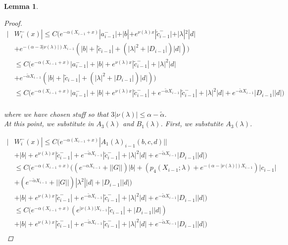 \documentclass[12pt]{article}
\newtheorem{lemma}{Lemma}
\begin{document}
\begin{lemma}
\begin{proof}
\begin{align*}
| &W_i^-(x)| \leq C \Big(e^{-\alpha(X_{i-1} + x)}|a_{i-1}^-| + |b| + e^{\nu(\lambda)x} |\tilde{c}_{i-1}^-| + |\lambda|^2 |d| \\
&+ e^{-(\alpha - 3|\nu(\lambda)|)X_{i-1}} ( |b| + |\tilde{c}_{i-1}| + (|\lambda|^2 + |D_{i-1}|)|d| ) \Big) \\
&\leq C \Big(e^{-\alpha(X_{i-1} + x)}|a_{i-1}^-| + |b| + e^{\nu(\lambda)x} |\tilde{c}_{i-1}^-| + |\lambda|^2 |d| \\
&+ e^{-\tilde{\alpha} X_{i-1}} ( |b| + |\tilde{c}_{i-1}| + (|\lambda|^2 + |D_{i-1}|)|d| ) \Big) \\
&\leq C \Big(e^{-\alpha(X_{i-1} + x)}|a_{i-1}^-| + |b| + e^{\nu(\lambda)x} |\tilde{c}_{i-1}^-| + e^{-\tilde{\alpha} X_{i-1}} |\tilde{c}_{i-1}^-| + |\lambda|^2 |d| + e^{-\tilde{\alpha} X_{i-1}} |D_{i-1}||d| \Big) \\
\end{align*}

where we have chosen stuff so that $3|\nu(\lambda)| \leq \alpha - \tilde{\alpha}$.\\

At this point, we substitute in $A_3(\lambda)$ and $B_1(\lambda)$. First, we substutite $A_3(\lambda)$.

\begin{align*}
| &W_i^-(x)| \leq C \Big(e^{-\alpha(X_{i-1} + x)}|A_1(\lambda)_{i-1}(b, c, d)|| \\
&+ |b| + e^{\nu(\lambda)x} |\tilde{c}_{i-1}^-| + e^{-\tilde{\alpha} X_{i-1}} |\tilde{c}_{i-1}^-| + |\lambda|^2 |d| + e^{-\tilde{\alpha} X_{i-1}} |D_{i-1}||d| \Big) \\
&\leq C \Big(e^{-\alpha(X_{i-1} + x)}( (e^{-\alpha X_{i-1}} + ||G||) |b| + ( p_4(X_{i-1}; \lambda) + e^{-(\alpha - |\nu(\lambda)|)X_{i-1}} )|c_{i-1}| \\
&+ (e^{-\tilde{\alpha} X_{i-1}} + ||G||) |\lambda^2| |d| + |D_{i-1}||d| ) \\
&+ |b| + e^{\nu(\lambda)x} |\tilde{c}_{i-1}^-| + e^{-\tilde{\alpha} X_{i-1}} |\tilde{c}_{i-1}^-| + |\lambda|^2 |d| + e^{-\tilde{\alpha} X_{i-1}} |D_{i-1}||d| \Big) \\
&\leq C \Big(e^{-\alpha(X_{i-1} + x)}( e^{|\nu(\lambda)| X_{i-1}} |\tilde{c}_{i-1}| + |D_{i-1}||d| ) \\
&+ |b| + e^{\nu(\lambda)x} |\tilde{c}_{i-1}^-| + e^{-\tilde{\alpha} X_{i-1}} |\tilde{c}_{i-1}^-| + |\lambda|^2 |d| + e^{-\tilde{\alpha} X_{i-1}} |D_{i-1}||d| \Big) \\
\end{align*}


\end{proof}
\end{lemma}
\end{document}
